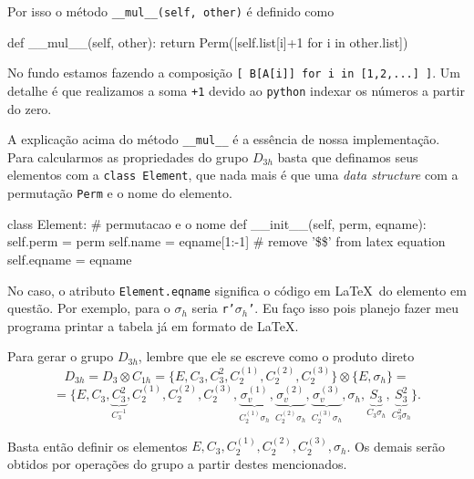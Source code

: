 \documentclass[a4paper,10pt]{article}
\newcommand{\python}[1]{\texttt{#1}}
\begin{document}
Por isso o método \python{__mul__(self, other)} é definido como
\begin{Python}
def __mul__(self, other):
    return Perm([self.list[i]+1 for i in other.list])
\end{Python}

No fundo estamos fazendo a composição \python{[ B[A[i]] for i in [1,2,...] ]}. Um detalhe é que realizamos a soma \python{+1} devido ao \python{python} indexar os números a partir do zero.

A explicação acima do método \python{__mul__} é a essência de nossa implementação. Para calcularmos as propriedades do grupo $D_{3h}$ basta que definamos seus elementos com a \python{class Element}, que nada mais é que uma \textit{data structure} com a permutação \python{Perm} e o nome do elemento.
\begin{Python}
class Element:  # permutacao e o nome
    def __init__(self, perm, eqname):
        self.perm = perm
        self.name = eqname[1:-1]  # remove '\$\$' from latex equation
        self.eqname = eqname
\end{Python}

No caso, o atributo \python{Element.eqname} significa o código em \LaTeX \, do elemento em questão. Por exemplo, para o $\sigma_h$ seria \python{r'$\sigma_h$'}. Eu faço isso pois planejo fazer meu programa printar a tabela já em formato de \LaTeX.

Para gerar o grupo $D_{3h}$, lembre que ele se escreve como o produto direto
\begin{equation} \label{eq:D3h-direct}
D_{3h} = D_3 \otimes C_{1h} =
\{E, C_3, C_3^2, C_2^{(1)}, C_2^{(2)}, C_2^{(3)}\} \otimes \{E, \sigma_h\} =
\end{equation}
$$
=
\{E, C_3, \underbrace{C_3^2}_{C_3^{-1}}, C_2^{(1)}, C_2^{(2)}, C_2^{(3)},
\underbrace{\sigma_v^{(1)}}_{C_2^{(1)} \sigma_h},
\underbrace{\sigma_v^{(2)}}_{C_2^{(2)} \sigma_h},
\underbrace{\sigma_v^{(3)}}_{C_2^{(3)} \sigma_h},
\sigma_h,
\underbrace{S_3}_{C_3 \sigma_h},
\underbrace{S_3^2}_{C_3^2 \sigma_h}\}.
$$

Basta então definir os elementos $E, C_3, C_2^{(1)}, C_2^{(2)}, C_2^{(3)}, \sigma_h$. Os demais serão obtidos por operações do grupo a partir destes mencionados.
\end{document}
